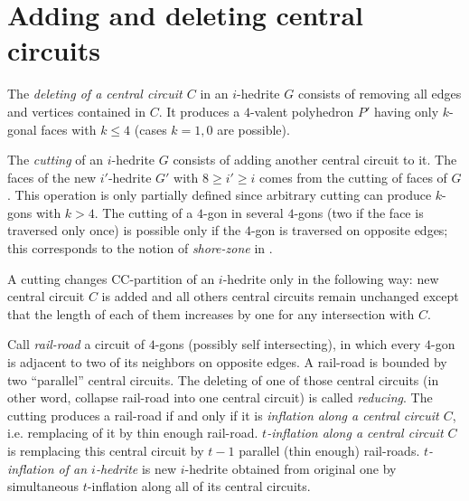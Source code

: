 \documentclass[12pt]{article}
\begin{document}
\section{Adding and deleting central circuits}


%
%
%
%
%


The {\em deleting of a central circuit $C$} in an $i$-hedrite $G$ consists 
of removing all edges and vertices contained in $C$. It produces a 
$4$-valent polyhedron $P'$ having only $k$-gonal faces 
with $k \leq 4$ (cases $k=1,0$ are possible).


The {\em cutting} of an $i$-hedrite $G$ consists of adding another central 
circuit to it. The faces of the new $i'$-hedrite $G'$ with $8\geq i'\geq i$ 
comes from the cutting of faces of $G$. This operation is only partially
defined since arbitrary cutting can produce $k$-gons with $k>4$. The 
cutting of a $4$-gon in several $4$-gons (two if the face
is traversed only once) is possible only if the $4$-gon is traversed 
on opposite edges; this corresponds to the notion of {\it shore-zone} 
in \cite{DSt}.


A cutting changes CC-partition of an $i$-hedrite only in the following 
way: new central circuit $C$ is added and all others central circuits 
remain unchanged except that the length of each of them increases by one 
for any intersection with $C$. 


Call {\em rail-road} a circuit of $4$-gons (possibly self intersecting), 
in which every $4$-gon is adjacent to two of its neighbors on opposite
edges. A rail-road is bounded by two ``parallel'' central circuits.
The deleting of  one of those central circuits (in other word, collapse 
rail-road into one central circuit) is called {\em reducing}.
The cutting produces a rail-road if and only if it is {\em inflation 
along a central circuit $C$}, i.e. remplacing of it by thin enough 
rail-road. {\em $t$-inflation along a central circuit $C$} is remplacing
this central circuit by $t-1$ parallel (thin enough) rail-roads.
{\em $t$-inflation of an $i$-hedrite} is new $i$-hedrite
obtained from original one by simultaneous $t$-inflation along all
of its central circuits. 
\end{document}
